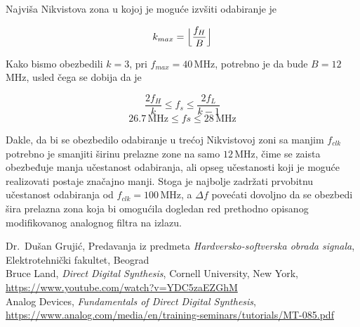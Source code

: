 \documentclass[conference]{IEEEtran}
\DeclarePairedDelimiter{\floor}{\lfloor}{\rfloor}
\begin{document}
Najviša Nikvistova zona u kojoj je moguće izvšiti odabiranje je 

\begin{equation}
k_{max} = \floor[\Big]{\frac{f_H}{B}}
\end{equation}

\noindent Kako bismo obezbedili $k=3$, pri $f_{max}=40$\,MHz, potrebno je da bude $B=12$\,MHz, usled čega se dobija da je

\begin{equation}
\frac{2f_H}{k}\leq f_s\leq \frac{2f_L}{k-1}	
\end{equation}
\begin{equation}
26.7\,\text{MHz}\leq fs\leq 28\,\text{MHz}
\end{equation}

Dakle, da bi se obezbedilo odabiranje u trećoj Nikvistovoj zoni sa manjim $f_{clk}$ potrebno je smanjiti širinu prelazne zone na samo $12$\,MHz, čime se zaista obezbeđuje manja učestanost odabiranja, ali opseg učestanosti koji je moguće realizovati postaje značajno manji. Stoga je najbolje zadržati prvobitnu učestanost odabiranja od $f_{clk}=100$\,MHz, a $\Delta f$ povećati dovoljno da se obezbedi šira prelazna zona koja bi omogućila dogledan red prethodno opisanog modifikovanog analognog filtra na izlazu. 


\begin{thebibliography}{00}
 Dr.~Dušan Grujić, Predavanja iz predmeta \textsl{Hardversko-softverska obrada signala}, Elektrotehnički fakultet, Beograd\\
 Bruce Land, \textsl{Direct Digital Synthesis}, Cornell University, New York, \\\url{https://www.youtube.com/watch?v=YDC5zaEZGhM}\\
 Analog Devices, \textsl{Fundamentals of Direct Digital Synthesis}, \\\url{https://www.analog.com/media/en/training-seminars/tutorials/MT-085.pdf}
\end{thebibliography}
\end{document}
